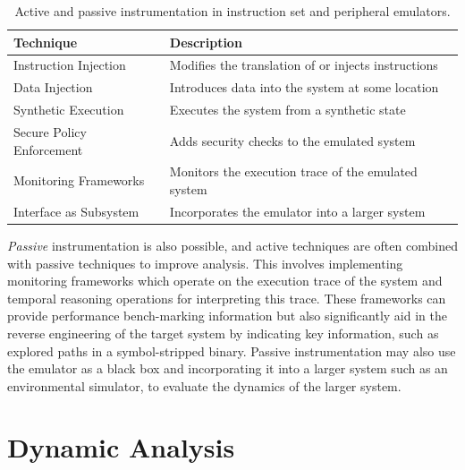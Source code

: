 \begin{table}[h]
\centering
\begin{tabular}{|l|l|}
\hline
\textbf{Technique} & \textbf{Description} \\ \hline
\multirow{2}{*}{Instruction Injection} & \multirow{2}{*}{Modifies the translation of or injects instructions} \\
 & \\ \hline
\multirow{2}{*}{Data Injection} & \multirow{2}{*}{Introduces data into the system at some location} \\
 & \\ \hline
\multirow{2}{*}{Synthetic Execution} & \multirow{2}{*}{Executes the system from a synthetic state} \\
 & \\ \hline
\multirow{2}{*}{Secure Policy Enforcement} & \multirow{2}{*}{Adds security checks to the emulated system} \\
 & \\ \hline
\multirow{2}{*}{Monitoring Frameworks} & \multirow{2}{*}{Monitors the execution trace of the emulated system} \\
 & \\ \hline
\multirow{2}{*}{Interface as Subsystem} & \multirow{2}{*}{Incorporates the emulator into a larger system} \\
 & \\ \hline
\end{tabular}
\caption{Active and passive instrumentation in instruction set and peripheral emulators.}
\label{tab:instruments}
\end{table}

\emph{Passive} instrumentation is also possible, and active techniques are often combined with passive techniques to improve analysis.
This involves implementing monitoring frameworks which operate on the execution trace of the system and temporal reasoning operations for interpreting this trace.
These frameworks can provide performance bench-marking information but also significantly aid in the reverse engineering of the target system by indicating key information, such as explored paths in a symbol-stripped binary.
Passive instrumentation may also use the emulator as a black box and incorporating it into a larger system such as an environmental simulator, to evaluate the dynamics of the larger system.

\section{Dynamic Analysis}
\label{sec:dynanal}

